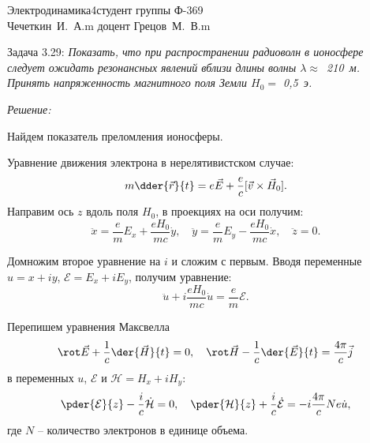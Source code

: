 





\newcommand{\ds}{\displaystyle}
\newcommand{\E}{\mathcal{E}}
\renewcommand{\H}{\mathcal{H}}

\setcounter{task}{0}
\renewcommand{\theequation}{\arabic{task}.\arabic{equation}}
\newcommand{\reset}{\addtocounter{task}{1} \setcounter{equation}{0}}


{Электродинамика}{4}{}{студент группы Ф-369\\Чечеткин~И.~А.}{m}
{доцент Грецов~М.~В.}{m}

\newpage \reset
Задача 3.29: \emph{Показать, что при распространении радиоволн в ионосфере
следует ожидать резонансных явлений вблизи длины волны
\( \lambda \approx \)~210~м. Принять напряженность магнитного поля Земли
\( H_0 = \) 0,5~э.}

\vspace*{2em}
\emph{Решение:}

Найдем показатель преломления ионосферы.

Уравнение движения электрона в нерелятивистском случае:
\[
    m\dder{\vec{r}}{t} = e\vec{E} + \frac{e}{c}[\vec{v}\times\vec{H}_0].
\]
Направим ось \( z \) вдоль поля \( H_0 \), в проекциях на оси получим:
\[
    \ddot{x} = \frac{e}{m}E_x + \frac{eH_0}{mc}\dot{y}, \quad
    \ddot{y} = \frac{e}{m}E_y - \frac{eH_0}{mc}\dot{x}, \quad
    \ddot{z} = 0.
\]

Домножим второе уравнение на \( i \) и сложим с первым. Вводя переменные
\( u = x + iy \), \( \E = E_x + iE_y \), получим уравнение:
\begin{equation}
    \ddot{u} + i\frac{eH_0}{mc}\dot{u} = \frac{e}{m}\E.
    \label{eq1.1}
\end{equation}

Перепишем уравнения Максвелла
\[
    \rot\vec{E} + \frac{1}{c}\der{\vec{H}}{t} = 0, \quad
    \rot\vec{H} - \frac{1}{c}\der{\vec{E}}{t} = \frac{4\pi}{c}\vec{j}
\]
в переменных \( u \), \( \E \) и \( \H = H_x + iH_y \):
\begin{equation}
    \pder{\E}{z} - \frac{i}{c}\dot{\H} = 0, \quad
    \pder{\H}{z} + \frac{i}{c}\dot{\E} = -i\frac{4\pi}{c}Ne\dot{u},
    \label{eq1.2}
\end{equation}
где \( N \) -- количество электронов в единице объема.

